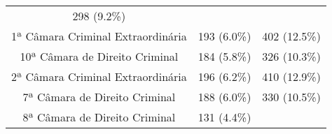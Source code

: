 \documentclass[10pt,]{article}
\begin{document}
\begin{longtable}[c]{@{}ccc@{}}
\begin{minipage}[t]{0.24\columnwidth}
298 (9.2\%)
\strut\end{minipage}\tabularnewline
\begin{minipage}[t]{0.39\columnwidth}\centering\strut
1ª Câmara Criminal Extraordinária
\strut\end{minipage} &
\begin{minipage}[t]{0.16\columnwidth}\centering\strut
193 (6.0\%)
\strut\end{minipage} &
\begin{minipage}[t]{0.24\columnwidth}\centering\strut
402 (12.5\%)
\strut\end{minipage}\tabularnewline
\begin{minipage}[t]{0.39\columnwidth}\centering\strut
10ª Câmara de Direito Criminal
\strut\end{minipage} &
\begin{minipage}[t]{0.16\columnwidth}\centering\strut
184 (5.8\%)
\strut\end{minipage} &
\begin{minipage}[t]{0.24\columnwidth}\centering\strut
326 (10.3\%)
\strut\end{minipage}\tabularnewline
\begin{minipage}[t]{0.39\columnwidth}\centering\strut
2ª Câmara Criminal Extraordinária
\strut\end{minipage} &
\begin{minipage}[t]{0.16\columnwidth}\centering\strut
196 (6.2\%)
\strut\end{minipage} &
\begin{minipage}[t]{0.24\columnwidth}\centering\strut
410 (12.9\%)
\strut\end{minipage}\tabularnewline
\begin{minipage}[t]{0.39\columnwidth}\centering\strut
7ª Câmara de Direito Criminal
\strut\end{minipage} &
\begin{minipage}[t]{0.16\columnwidth}\centering\strut
188 (6.0\%)
\strut\end{minipage} &
\begin{minipage}[t]{0.24\columnwidth}\centering\strut
330 (10.5\%)
\strut\end{minipage}\tabularnewline
\begin{minipage}[t]{0.39\columnwidth}\centering\strut
8ª Câmara de Direito Criminal
\strut\end{minipage} &
\begin{minipage}[t]{0.16\columnwidth}\centering\strut
131 (4.4\%)
\strut\end{minipage} &

\end{longtable}
\end{document}
